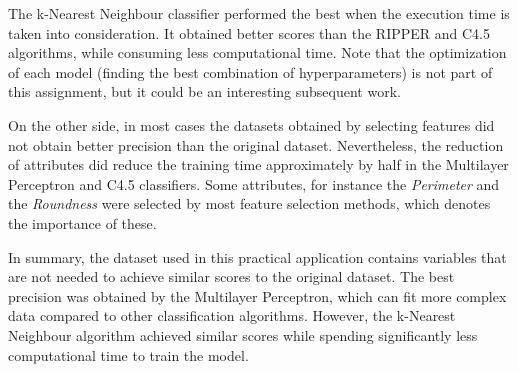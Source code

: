 \documentclass[a4paper,11pt]{article}
\begin{document}
The k-Nearest Neighbour classifier performed the best when the execution time is taken into consideration. It obtained better scores than the RIPPER and C4.5 algorithms, while consuming less computational time. Note that the optimization of each model (finding the best combination of hyperparameters) is not part of this assignment, but it could be an interesting subsequent work.

On the other side, in most cases the datasets obtained by selecting features did not obtain better precision than the original dataset. Nevertheless, the reduction of attributes did reduce the training time approximately by half in the Multilayer Perceptron and C4.5 classifiers. Some attributes, for instance the \textit{Perimeter} and the \textit{Roundness} were selected by most feature selection methods, which denotes the importance of these.

In summary, the dataset used in this practical application contains variables that are not needed to achieve similar scores to the original dataset. The best precision was obtained by the Multilayer Perceptron, which can fit more complex data compared to other classification algorithms. However, the k-Nearest Neighbour algorithm achieved similar scores while spending significantly less computational time to train the model.

\newpage


\end{document}
